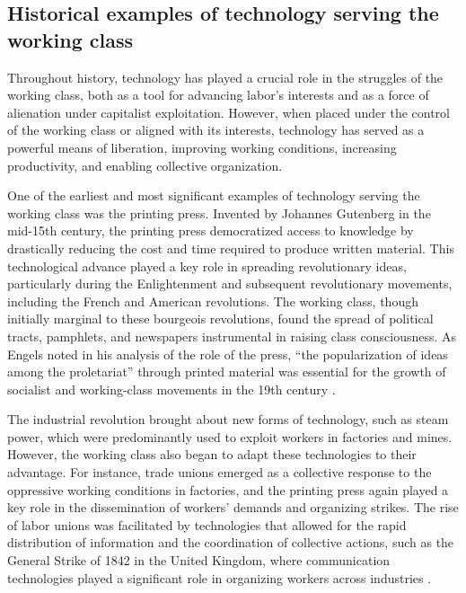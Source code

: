 \begin{refsection}
\subsection{Historical examples of technology serving the working class}

Throughout history, technology has played a crucial role in the struggles of the working class, both as a tool for advancing labor's interests and as a force of alienation under capitalist exploitation. However, when placed under the control of the working class or aligned with its interests, technology has served as a powerful means of liberation, improving working conditions, increasing productivity, and enabling collective organization.

One of the earliest and most significant examples of technology serving the working class was the printing press. Invented by Johannes Gutenberg in the mid-15th century, the printing press democratized access to knowledge by drastically reducing the cost and time required to produce written material. This technological advance played a key role in spreading revolutionary ideas, particularly during the Enlightenment and subsequent revolutionary movements, including the French and American revolutions. The working class, though initially marginal to these bourgeois revolutions, found the spread of political tracts, pamphlets, and newspapers instrumental in raising class consciousness. As Engels noted in his analysis of the role of the press, “the popularization of ideas among the proletariat” through printed material was essential for the growth of socialist and working-class movements in the 19th century \cite[pp.~183-184]{engels1894}.

The industrial revolution brought about new forms of technology, such as steam power, which were predominantly used to exploit workers in factories and mines. However, the working class also began to adapt these technologies to their advantage. For instance, trade unions emerged as a collective response to the oppressive working conditions in factories, and the printing press again played a key role in the dissemination of workers' demands and organizing strikes. The rise of labor unions was facilitated by technologies that allowed for the rapid distribution of information and the coordination of collective actions, such as the General Strike of 1842 in the United Kingdom, where communication technologies played a significant role in organizing workers across industries \cite[pp.~228-229]{hobsbawm1968}.


\end{refsection}
